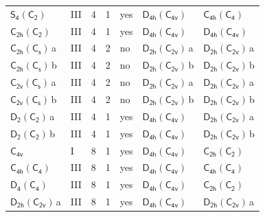 \documentclass[10pt,a4paper]{article}
\numberwithin{equation}{section}
\newcommand{\grp}[1]{\mathsf{#1}}
\newcommand{\clsletter}[1]{\,{\scriptsize\color{black!55}#1}}
\begin{document}
{\begin{longtable}{@{}llrrlll@{}}
\href{S4-C2.pdf}{$\grp{S_{4}}(\grp{C_{2}})$} & III & 4 & 1 & yes & \href{D4h-C4v.pdf}{$\grp{D_{4h}}(\grp{C_{4v}})$} & \href{C4h-C4.pdf}{$\grp{C_{4h}}(\grp{C_{4}})$}\\
\href{C2h-C2.pdf}{$\grp{C_{2h}}(\grp{C_{2}})$} & III & 4 & 1 & yes & \href{D4h-C4v.pdf}{$\grp{D_{4h}}(\grp{C_{4v}})$} & \href{D4h-C4v.pdf}{$\grp{D_{4h}}(\grp{C_{4v}})$}\\
\href{C2h-C1v.pdf}{$\grp{C_{2h}}(\grp{C_{s}})$}\clsletter{a} & III & 4 & 2 & no & \href{D2h-C2v.pdf}{$\grp{D_{2h}}(\grp{C_{2v}})$}\clsletter{a} & \href{D2h-C2v.pdf}{$\grp{D_{2h}}(\grp{C_{2v}})$}\clsletter{a}\\
\href{C2h-C1v.pdf}{$\grp{C_{2h}}(\grp{C_{s}})$}\clsletter{b} & III & 4 & 2 & no & \href{D2h-C2v.pdf}{$\grp{D_{2h}}(\grp{C_{2v}})$}\clsletter{b} & \href{D2h-C2v.pdf}{$\grp{D_{2h}}(\grp{C_{2v}})$}\clsletter{b}\\
\href{C2v-C1v.pdf}{$\grp{C_{2v}}(\grp{C_{s}})$}\clsletter{a} & III & 4 & 2 & no & \href{D2h-C2v.pdf}{$\grp{D_{2h}}(\grp{C_{2v}})$}\clsletter{a} & \href{D2h-C2v.pdf}{$\grp{D_{2h}}(\grp{C_{2v}})$}\clsletter{a}\\
\href{C2v-C1v.pdf}{$\grp{C_{2v}}(\grp{C_{s}})$}\clsletter{b} & III & 4 & 2 & no & \href{D2h-C2v.pdf}{$\grp{D_{2h}}(\grp{C_{2v}})$}\clsletter{b} & \href{D2h-C2v.pdf}{$\grp{D_{2h}}(\grp{C_{2v}})$}\clsletter{b}\\
\href{D2-C2.pdf}{$\grp{D_{2}}(\grp{C_{2}})$}\clsletter{a} & III & 4 & 1 & yes & \href{D4h-C4v.pdf}{$\grp{D_{4h}}(\grp{C_{4v}})$} & \href{D2h-C2v.pdf}{$\grp{D_{2h}}(\grp{C_{2v}})$}\clsletter{a}\\
\href{D2-C2.pdf}{$\grp{D_{2}}(\grp{C_{2}})$}\clsletter{b} & III & 4 & 1 & yes & \href{D4h-C4v.pdf}{$\grp{D_{4h}}(\grp{C_{4v}})$} & \href{D2h-C2v.pdf}{$\grp{D_{2h}}(\grp{C_{2v}})$}\clsletter{b}\\
\href{../../../rotation/data/pdf/C4v.pdf}{$\grp{C_{4v}}$} & I & 8 & 1 & yes & \href{D4h-C4v.pdf}{$\grp{D_{4h}}(\grp{C_{4v}})$} & \href{C2h-C2.pdf}{$\grp{C_{2h}}(\grp{C_{2}})$}\\
\href{C4h-C4.pdf}{$\grp{C_{4h}}(\grp{C_{4}})$} & III & 8 & 1 & yes & \href{D4h-C4v.pdf}{$\grp{D_{4h}}(\grp{C_{4v}})$} & \href{C4h-C4.pdf}{$\grp{C_{4h}}(\grp{C_{4}})$}\\
\href{D4-C4.pdf}{$\grp{D_{4}}(\grp{C_{4}})$} & III & 8 & 1 & yes & \href{D4h-C4v.pdf}{$\grp{D_{4h}}(\grp{C_{4v}})$} & \href{C2h-C2.pdf}{$\grp{C_{2h}}(\grp{C_{2}})$}\\
\href{D2h-C2v.pdf}{$\grp{D_{2h}}(\grp{C_{2v}})$}\clsletter{a} & III & 8 & 1 & yes & \href{D4h-C4v.pdf}{$\grp{D_{4h}}(\grp{C_{4v}})$} & \href{D2h-C2v.pdf}{$\grp{D_{2h}}(\grp{C_{2v}})$}\clsletter{a}\\

\end{longtable}}
\end{document}

